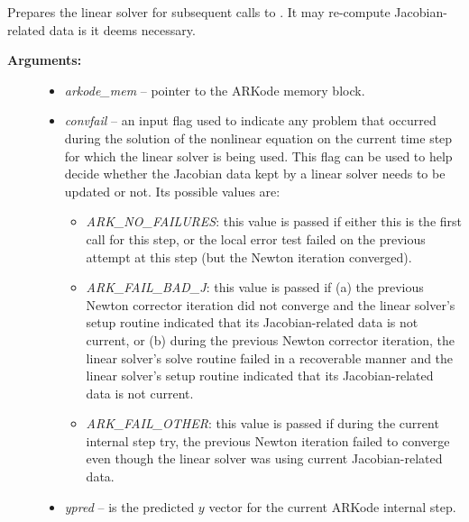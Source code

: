 \documentclass[letterpaper,10pt,english]{sphinxmanual}
\begin{document}
\begin{fulllineitems}
\label{linear_solvers/custom:lsetup}
Prepares the linear solver for subsequent calls to
{\hyperref[linear_solvers/custom:lsolve]{}}. It may re-compute Jacobian-related data is it
deems necessary.
\begin{description}
\item[{\textbf{Arguments:}}] \leavevmode\begin{itemize}
\item {} 
\emph{arkode\_mem} -- pointer to the ARKode memory block.

\item {} 
\emph{convfail} -- an input flag used to indicate any problem that
occurred during the solution of the nonlinear equation on the
current time step for which the linear solver is being
used. This flag can be used to help decide whether the
Jacobian data kept by a linear solver needs to be
updated or not. Its possible values are:
\begin{itemize}
\item {} 
\emph{ARK\_NO\_FAILURES}: this value is passed if either this is the
first call for this step, or the local error test failed on
the previous attempt at this step (but the Newton iteration
converged).

\item {} 
\emph{ARK\_FAIL\_BAD\_J}: this value is passed if (a) the previous
Newton corrector iteration did not converge and the linear
solver's setup routine indicated that its Jacobian-related
data is not current, or (b) during the previous Newton
corrector iteration, the linear solver's solve routine
failed in a recoverable manner and the linear solver's setup
routine indicated that its Jacobian-related data is not
current.

\item {} 
\emph{ARK\_FAIL\_OTHER}: this value is passed if during the current
internal step try, the previous Newton iteration failed to
converge even though the linear solver was using current
Jacobian-related data.

\end{itemize}

\item {} 
\emph{ypred} -- is the predicted $y$ vector for the current
ARKode internal step.


\end{itemize}
\end{description}
\end{fulllineitems}
\end{document}
